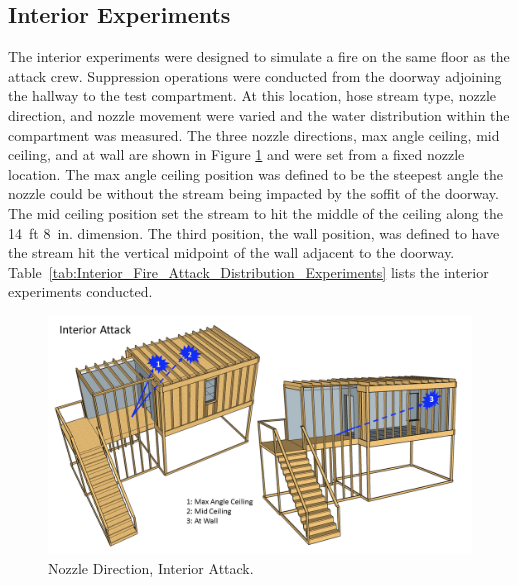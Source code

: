 \documentclass[12pt,oneside]{book}
\begin{document}
\subsection{Interior Experiments}
\label{int_tests}
The interior experiments were designed to simulate a fire on the same floor as the attack crew. Suppression operations were conducted from the doorway adjoining the hallway to the test compartment. At this location, hose stream type, nozzle direction, and nozzle movement were varied and the water distribution within the compartment was measured. The three nozzle directions, max angle ceiling, mid ceiling, and at wall are shown in Figure \ref{fig:Nozzle_Direction_Interior_Attack} and were set from a fixed nozzle location. The max angle ceiling position was defined to be the steepest angle the nozzle could be without the stream being impacted by the soffit of the doorway. The mid ceiling position set the stream to hit the middle of the ceiling along the 14~ft 8~in. dimension. The third position, the wall position, was defined to have the stream hit the vertical midpoint of the wall adjacent to the doorway. Table~\ref{tab:Interior_Fire_Attack_Distribution_Experiments} lists the interior experiments conducted.

\begin{figure}[!ht]
	\centering
	\includegraphics[width=\columnwidth]{Figures/Water_Distribution/Nozzle_Position_Int}
	\caption[Nozzle Direction, Interior Attack]{Nozzle Direction, Interior Attack.}
	\label{fig:Nozzle_Direction_Interior_Attack}
\end{figure}
\end{document}
